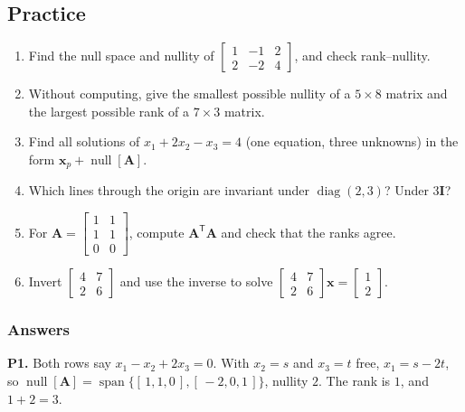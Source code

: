\documentclass[11pt]{article}
\theoremstyle{plain}
\theoremstyle{definition}
\theoremstyle{remark}
\newcommand{\vc}[1]{\mathbf{#1}}
\newcommand{\mt}[1]{\mathbf{#1}}
\newcommand{\T}{^{\mathsf{T}}}
\newcommand{\nullsp}[1]{\operatorname{null}[#1]}
\DeclareMathOperator{\spanop}{span}
\DeclareMathOperator{\diagop}{diag}
\begin{document}
\subsection{Practice}
\begin{enumerate}[label=\textbf{P\arabic*.},leftmargin=2.6em,itemsep=5pt]
  \item Find the null space and nullity of
        $\begin{bmatrix}1&-1&2\\2&-2&4\end{bmatrix}$, and check rank--nullity.
  \item Without computing, give the smallest possible nullity of a $5\times8$
        matrix and the largest possible rank of a $7\times3$ matrix.
  \item Find all solutions of $x_1+2x_2-x_3=4$ (one equation, three unknowns) in
        the form $\vc{x}_p+\nullsp{\mt{A}}$.
  \item Which lines through the origin are invariant under
        $\diagop(2,3)$? Under $3\mt{I}$?
  \item For $\mt{A}=\begin{bmatrix}1&1\\1&1\\0&0\end{bmatrix}$, compute
        $\mt{A}\T\mt{A}$ and check that the ranks agree.
  \item Invert $\begin{bmatrix}4&7\\2&6\end{bmatrix}$ and use the inverse to solve
        $\begin{bmatrix}4&7\\2&6\end{bmatrix}\vc{x}=\begin{bmatrix}1\\2\end{bmatrix}$.
\end{enumerate}

\subsubsection*{Answers}

\noindent\textbf{P1.} Both rows say $x_1-x_2+2x_3=0$. With $x_2=s$ and $x_3=t$
free, $x_1=s-2t$, so
$\nullsp{\mt{A}}=\spanop\{[\,1,1,0\,],[\,-2,0,1\,]\}$, nullity $2$. The rank is
$1$, and $1+2=3$. \checkmark
\end{document}

